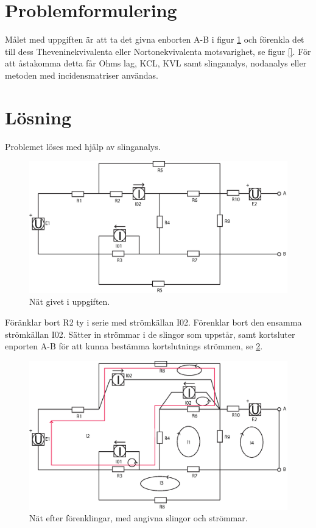 \documentclass[a4paper,12pt]{article}
\begin{document}
\maketitle
\thispagestyle{empty}
\newpage

\section*{Problemformulering}
Målet med uppgiften är att ta det givna enborten A-B i figur \ref{fig:original} och förenkla det till dess Theveninekvivalenta eller Nortonekvivalenta motsvarighet, se figur \ref{}. För att åstakomma detta får Ohms lag, KCL, KVL samt slinganalys, nodanalys eller metoden med incidensmatriser användas.

\section*{Lösning}
Problemet löses med hjälp av slinganalys.

\begin{figure}[h]
\centering
\includegraphics[width=1\textwidth]{bilder/originalnat.eps}
\caption{Nät givet i uppgiften.}
\label{fig:original}
\end{figure}

Föränklar bort R2 ty i serie med strömkällan I02. Förenklar bort den ensamma strömkällan I02. Sätter in strömmar i de slingor som uppstår, samt kortsluter enporten A-B för att kunna bestämma kortslutnings strömmen, se \ref{fig:modnat}.

\begin{figure}[h]
\centering
\includegraphics[width=1\textwidth]{bilder/modnat.eps}
\caption{Nät efter förenklingar, med angivna slingor och strömmar.}
\label{fig:modnat}
\end{figure}
\end{document}
